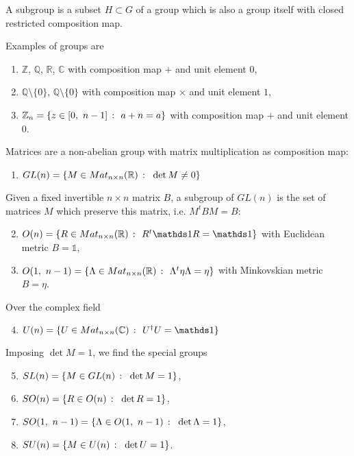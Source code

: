     \begin{definition}[Subgroup]
        A subgroup is a subset $H \subset G$ of a group which is also a group itself with closed restricted composition map.
    \end{definition}

    \begin{example}[Groups]
        Examples of groups are
        \begin{enumerate}
            \item $\mathbb Z$, $\mathbb Q$, $\mathbb R$, $\mathbb C$ with composition map $+$ and unit element $0$,
            \item $\mathbb Q\setminus\{0\}$, $\mathbb Q\setminus\{0\}$ with composition map $\times$ and unit element $1$,
            \item $\mathbb Z_n = \{z \in [0, ~n-1]~\colon~a+n = a\}$ with composition map $+$ and unit element $0$.
        \end{enumerate}
    \end{example}

    \begin{example}
        Matrices are a non-abelian group with matrix multiplication as composition map:
        \begin{enumerate}
            \item $GL(n) = \{M \in Mat_{n \times n}(\mathbb R)~\colon~\det M \neq 0\}$
        \end{enumerate}
        Given a fixed invertible $n\times n$ matrix $B$, a subgroup of $GL(n)$ is the set of matrices $M$ which preserve this matrix, i.e. $M^{t}BM = B$:
        \begin{enumerate}
        \setcounter{enumi}{1}
            \item $O(n) = \set{R \in Mat_{n \times n}(\mathbb R)}{R^{t} \mathds 1 R = \mathds 1}$ with Euclidean metric $B = \mathds 1$,
            \item $O(1, ~n-1) = \{\Lambda \in Mat_{n \times n}(\mathbb R)~\colon~\Lambda^{t} \eta \Lambda = \eta\}$ with Minkovskian metric $B = \eta$.
        \end{enumerate}
        Over the complex field
        \begin{enumerate}
        \setcounter{enumi}{3}
        \item $U(n) = \set{U \in Mat_{n \times n}(\mathbb C)}{U^{\dagger} U = \mathds 1}$
        \end{enumerate}
        Imposing $\det M = 1$, we find the special groups
        \begin{enumerate}
        \setcounter{enumi}{4}
            \item $SL(n) = \{M \in GL(n)~\colon~\det M = 1\}$,
            \item $SO(n) = \{R \in O(n)~\colon~\det R = 1\}$,
            \item $SO(1,~n-1) = \{\Lambda \in O(1, ~n-1)~\colon~\det \Lambda = 1\}$,
            \item $SU(n) = \{M \in U(n)~\colon~\det U = 1\}$.
        \end{enumerate}
    \end{example}

